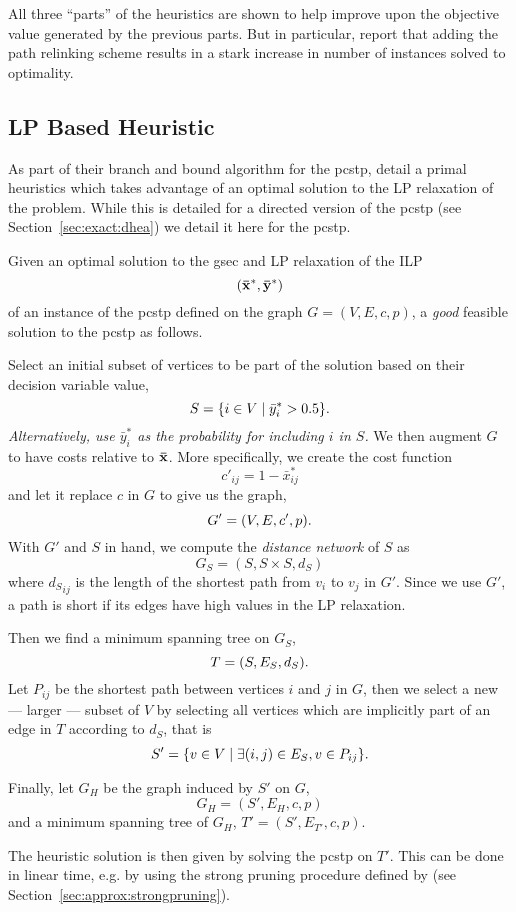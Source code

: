 All three ``parts'' of the heuristics are shown to help improve upon the
objective value generated by the previous parts.
But in particular, \citeauthor{canuto2001local} report that adding the
path relinking scheme results in a stark increase
 in number of instances solved to optimality.

 \subsection{LP Based Heuristic}
 \label{sec:heuristics:lp}
 As part of their branch and bound algorithm for the \gls{pcstp}, \cite{ljubic2005solving} detail a primal
 heuristics which takes advantage of an optimal solution to the LP relaxation of the problem. While this
 is detailed for a directed version of the \gls{pcstp} (see Section~\ref{sec:exact:dhea}) we detail it
 here for the \gls{pcstp}.
 
 Given an optimal solution to the \gls{gsec} and LP relaxation of the ILP
 \[(\mathbf{ \bar x^*}, \mathbf{\bar y^*})\]
 of an instance of the \gls{pcstp} defined on the graph $G = (V, E, c, p)$,
 a \textit{good} feasible solution to the \gls{pcstp} as follows.

 Select an initial subset of vertices to be part of the solution based on their decision variable value,
 \[S = \{ i \in V \mid \bar y^*_i > 0.5 \}\mathnormal{.}\]
 \textit{Alternatively, use $\bar y^*_i$ as the probability for including $i$ in $S$.}
 We then augment $G$ to have costs relative to $\mathbf{\bar{x}}$. More specifically,
 we create the cost function
 \[c'_{ij} = 1 - \bar{x}^*_{ij}\]
 and let it replace $c$ in $G$ to give us the graph,
 \[G' = (V, E, c', p)\mathnormal{.}\]
 With $G'$ and $S$ in hand, we compute the \textit{distance network} of $S$ as
 \[G_S = (S, S \times S, d_S)\]
 where ${d_S}_{ij}$ is the length of the shortest path from $v_i$ to $v_j$ in $G'$.
 Since we use $G'$, a path is short if its edges have high values in the LP
 relaxation.

 Then we find a minimum spanning tree on $G_S$,
 \[T = (S, E_S, d_S) \mathnormal{.}\]
 Let $P_{ij}$ be the shortest path between vertices $i$ and $j$ in $G$, then
 we select a new --- larger --- subset of $V$ by selecting all vertices which
 are implicitly part of an edge in $T$ according to $d_S$, that is
 \[S' = \{ v \in V \mid \exists (i,j) \in E_S, v \in P_{ij}\}\mathnormal{.}\]

 Finally, let $G_H$ be the graph induced by $S'$ on $G$,
 \[G_H = (S', E_H, c, p)\]
 and a minimum spanning tree of $G_H$, $T' = (S', E_{T'}, c, p)$.

 The heuristic solution is then given by solving the \gls{pcstp}
 on $T'$. This can be done in linear time, e.g. by using the
 strong pruning procedure defined by
 \citet{Johnson:2000:PCS:338219.338637}
 (see Section~\ref{sec:approx:strongpruning}).

 
 
 
